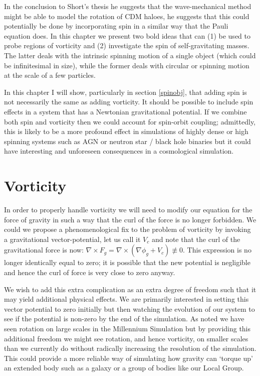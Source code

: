 In the conclusion to Short's thesis \citep{bib_short} he suggests that the wave-mechanical method might be able to model the rotation of CDM haloes, he suggests that this could potentially be done by incorporating spin in a similar way that the Pauli equation does. In this chapter we present two bold ideas that can (1) be used to probe regions of vorticity and (2) investigate the spin of self-gravitating masses. The latter deals with the intrinsic spinning motion of a single object (which could be infinitesimal in size), while the former deals with circular or spinning motion at the scale of a few particles.

In this chapter I will show, particularly in section \ref{spinobj}, that adding spin is not necessarily the same as adding vorticity. It should be possible to include spin effects in a system that has a Newtonian gravitational potential. If we combine both spin and vorticity then we could account for spin-orbit coupling; admittedly, this is likely to be a more profound effect in simulations of highly dense or high spinning systems such as AGN or neutron star / black hole binaries but it could have interesting and unforeseen consequences in a cosmological simulation.

\section{Vorticity}
In order to properly handle vorticity we will need to modify our equation for the force of gravity in such a way that the curl of the force is no longer forbidden. We could we propose a phenomenological fix to the problem of vorticity by invoking a gravitational vector-potential, let us call it $V_c$ and note that the curl of the gravitational force is now: $\nabla\times F_g = \nabla\times(\nabla\phi_g + V_c) \not\equiv 0$. This expression is no longer identically equal to zero; it is possible that the new potential is negligible and hence the curl of force is very close to zero anyway.

We wish to add this extra complication as an extra degree of freedom such that it may yield additional physical effects. We are primarily interested in setting this vector potential to zero initially but then watching the evolution of our system to see if the potential is non-zero by the end of the simulation. As noted we have seen rotation on large scales in the Millennium Simulation \citep{bib_mil} but by providing this additional freedom we might see rotation, and hence vorticity, on smaller scales than we currently do without radically increasing the resolution of the simulation. This could provide a more reliable way of simulating how gravity can `torque up' an extended body such as a galaxy or a group of bodies like our Local Group.

